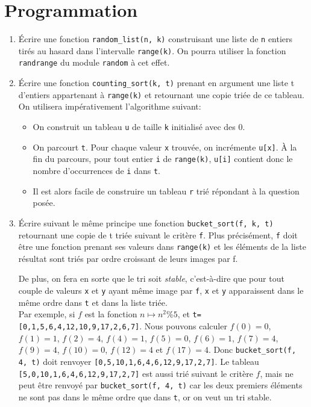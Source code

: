 \section{Programmation}
\begin{enumerate}
\item Écrire une fonction \texttt{random\_list(n, k)} construisant une
  liste de \texttt{n} entiers tirés au hasard dans l'intervalle
  \texttt{range(k)}. On pourra utiliser la fonction \texttt{randrange} du
  module \texttt{random} à cet effet.
\item Écrire une fonction \texttt{counting\_sort(k, t)} prenant en
  argument une liste t d'entiers appartenant à \texttt{range(k)} et
  retournant une copie triée de ce tableau. On utilisera
  impérativement l'algorithme suivant:
  \begin{itemize}
  \item On construit un tableau \texttt{u} de taille \texttt{k}
    initialisé avec des $0$.
  \item On parcourt \texttt{t}. Pour chaque valeur \texttt{x} trouvée, on
    incrémente \texttt{u[x]}. À la fin du parcours, pour tout entier
    \texttt{i} de \texttt{range(k)}, \texttt{u[i]} contient donc le nombre d'occurrences
    de \texttt{i} dans \texttt{t}.
  \item Il est alors facile de construire un tableau \texttt{r} trié
    répondant à la question posée.
  \end{itemize}
\item Écrire suivant le même principe une fonction \texttt{bucket\_sort(f,
    k, t)} retournant une copie de t triée suivant le critère
  \texttt{f}. Plus précisément, \texttt{f} doit être une fonction prenant ses
  valeurs dans \texttt{range(k)} et les éléments de la liste résultat sont
  triés par ordre croissant de leurs images par f.

  De plus, on fera en sorte que le tri soit \emph{stable},
  c'est-à-dire que pour tout couple de valeurs \texttt{x} et \texttt{y} ayant
  même image par \texttt{f}, \texttt{x} et \texttt{y} apparaissent dans le même
  ordre dans \texttt{t} et dans la liste triée.\\

Par exemple, si $f$ est la fonction $n\mapsto n^2 \% 5$, et \texttt{t=[0,1,5,6,4,12,10,9,17,2,6,7]}. Nous pouvons 
calculer $f(0)=0$, $f(1)=1$, $f(2)=4$, $f(4)=1$, $f(5)=0$, $f(6)=1$, $f(7)=4$, $f(9)=4$, $f(10)=0$, $f(12)=4$ et 
$f(17)=4$. Donc \texttt{bucket\_sort(f, 4, t)} doit renvoyer \texttt{[0,5,10,1,6,4,6,12,9,17,2,7]}. Le tableau  
\texttt{[5,0,10,1,6,4,6,12,9,17,2,7]} est aussi trié suivant le critère $f$, mais ne peut être renvoyé par 
\texttt{bucket\_sort(f, 4, t)} car les deux premiers éléments ne sont pas dans le même ordre que dans \texttt{t}, or on 
veut un tri stable.


\end{enumerate}
